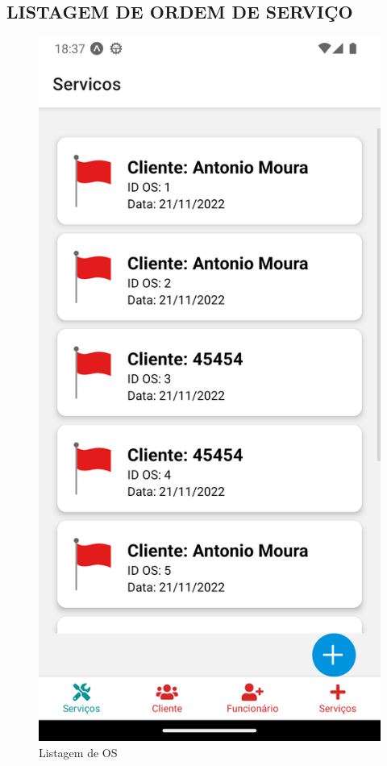 \subsection{LISTAGEM DE ORDEM DE SERVIÇO}
\begin{figure}[htb]
	\caption{\label{fig_diagrama-classes} Listagem de OS}
	\begin{center}
	    \includegraphics[width=0.5\linewidth]{imagens/listagemOS.png}
	\end{center}
\end{figure}

\newpage

